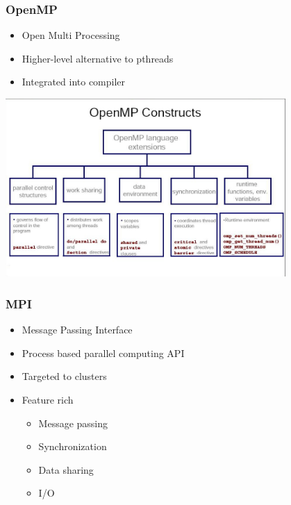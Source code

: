 \begin{frame}
  \frametitle{OpenMP}

  \begin{itemize}
  \item Open Multi Processing
  \item Higher-level alternative to pthreads
  \item Integrated into compiler
  \end{itemize}

  \begin{center}
    \includegraphics[width=0.8\textwidth,height=0.6\textheight,keepaspectratio]{img/openmp.jpg}
  \end{center}
\end{frame}



\begin{frame}
  \frametitle{MPI}

  \begin{itemize}
  \item Message Passing Interface
  \item Process based parallel computing API
  \item Targeted to clusters
  \item Feature rich
    \begin{itemize}
    \item Message passing
    \item Synchronization
    \item Data sharing
    \item I/O
    \end{itemize}
  \end{itemize}
\end{frame}
